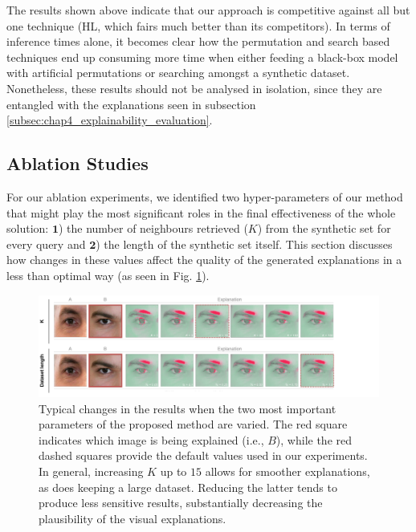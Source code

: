 The results shown above indicate that our approach is competitive against all but one technique (HL, which fairs much better than its competitors). In terms of inference times alone, it becomes clear how the permutation and search based techniques end up consuming more time when either feeding a black-box model with artificial permutations or searching amongst a synthetic dataset. Nonetheless, these results should not be analysed in isolation, since they are entangled with the explanations seen in subsection \ref{subsec:chap4_explainability_evaluation}.

\subsection{Ablation Studies}
\label{subsec:chap4_ablation_studies}

For our ablation experiments, we identified two hyper-parameters of our method that might play the most significant roles in the final effectiveness of the whole solution: $\mathbf{1}$) the number of neighbours retrieved ($K$) from the synthetic set for every query and $\mathbf{2}$) the length of the synthetic set itself. This section discusses how changes in these values affect the quality of the generated explanations in a less than optimal way (as seen in Fig. \ref{fig:ablation_study}).

\begin{figure}[h]
  \begin{center}
  \includegraphics[width=\textwidth]{figures/figure_40.pdf}
  \caption{Typical changes in the results when the two most important parameters of the proposed method are varied. The red square indicates which image is being explained (i.e., $B$), while the red dashed squares provide the default values used in our experiments. In general, increasing $K$ up to $15$ allows for smoother explanations, as does keeping a large dataset. Reducing the latter tends to produce less sensitive results, substantially decreasing the plausibility of the visual explanations.}
  \label{fig:ablation_study}
  \end{center}
\end{figure}

